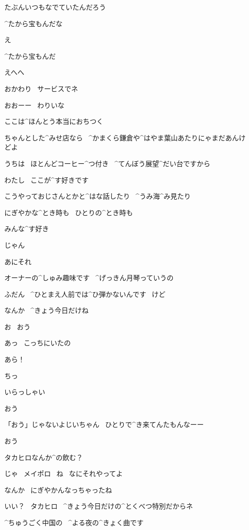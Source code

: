 \Ojisan たぶんいつもなでていたんだろう

\Ojisan ^{たから}{宝}もんだな

\Alpha え

\Ojisan ^{たから}{宝}もんだ

\Alpha えへへ

\page[33]
\Alpha おかわり
\ サービスでネ

\Ojisan おおーー
\ わりいな

\page[34]
\Ojisan ここは^{ほんとう}{本当}におちつく

\Alpha ちゃんとした^{みせ}{店}なら
\ ^{かまくら}{鎌倉}や^{はやま}{葉山}あたりにゃまだあんけどよ

\Alpha うちは
\ ほとんどコーヒー^{つ}{付}き
\ ^{てんぼう}{展望}^{だい}{台}ですから

\Alpha わたし
\ ここが^{す}{好}きです

\Alpha こうやっておじさんとかと^{はな}{話}したり
\ ^{うみ}{海}^{み}{見}たり

\Alpha にぎやかな^{とき}{時}も
\ ひとりの^{とき}{時}も

\Alpha みんな^{す}{好}き

\page[35]
\Alpha じゃん

\Ojisan あにそれ

\Alpha オーナーの^{しゅみ}{趣味}です
\ ^{げっきん}{月琴}っていうの

\Alpha ふだん
\ ^{ひとまえ}{人前}では^{ひ}{弾}かないんです
\ けど

\page[36]
\Alpha なんか
\ ^{きょう}{今日}だけね

\Ojisan お
\ おう

\Takahiro あっ
\ こっちにいたの

\Alpha あら！

\Ojisan ちっ

\Alpha いらっしゃい

\Ojisan おう

\Takahiro 「おう」じゃないよじいちゃん
\ ひとりで^{き}{来}てんたもんなーー

\Ojisan おう

\Alpha タカヒロなんか^{の}{飲}む？

\page[37]
\Takahiro じゃ
\ メイポロ
\ ね
\ なにそれやってよ

\Alpha なんか
\ にぎやかんなっちゃったね

\Alpha いい？
\ タカヒロ
\ ^{きょう}{今日}だけの^{とくべつ}{特別}だからネ

\Alpha ^{ちゅうごく}{中国}の
\ ^{よる}{夜}の^{きょく}{曲}です

